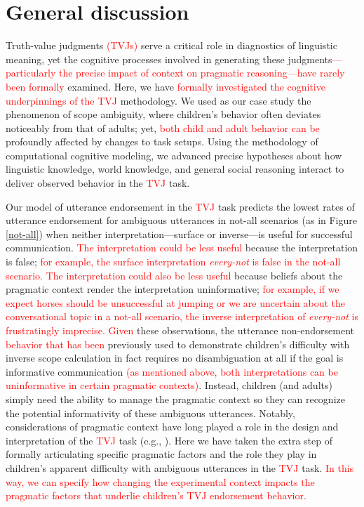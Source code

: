 \documentclass[preprint,authoryear]{elsarticle}\frenchspacing
\newcommand{\lp}[1]{\textcolor{red}{#1}} %
\begin{document}
\section{General discussion} \label{discussion}
Truth-value judgments 
\lp{(TVJs)}
serve a critical role in diagnostics of linguistic meaning, yet the cognitive processes involved in generating these judgments\lp{---particularly the precise impact of context on pragmatic reasoning---}\lp{have rarely been formally} examined. Here, we have 
\lp{formally investigated the cognitive underpinnings of the}
\lp{TVJ}
methodology. We used as our case study the phenomenon of scope ambiguity, where children's behavior often deviates noticeably from that of adults; yet, \lp{both child and adult behavior can be} profoundly affected by changes to task setups.  Using the methodology of computational cognitive modeling, we advanced precise hypotheses about how linguistic knowledge, world knowledge, and general social reasoning interact to deliver observed behavior in the 
\lp{TVJ}
task.

Our model of utterance endorsement in the %
\lp{TVJ}
task predicts the lowest rates of utterance endorsement for ambiguous utterances in not-all  scenarios (as in Figure \ref{not-all})
when neither interpretation---surface or inverse---is useful for successful communication.
\lp{The interpretation could be less useful}
 because the interpretation is false;  
\lp{for example, the surface interpretation \emph{every-not} is false in the not-all scenario.}
\lp{The interpretation could also be less useful} 
because beliefs about the pragmatic context render the interpretation uninformative;
\lp{for example, if we 
expect horses should be unsuccessful at jumping 
or 
we are uncertain about the conversational topic in a not-all scenario,
the inverse interpretation of \emph{every-not} %
is frustratingly imprecise.
} 
\lp{Given} these observations, 
 the utterance non-endorsement \lp{behavior} \lp{that has been} previously used to demonstrate children's difficulty with {inverse} scope calculation in fact requires no disambiguation at all if the goal is informative communication \lp{(as mentioned above, both interpretations can be uninformative in certain pragmatic contexts)}. Instead, children (and adults) simply need the ability to manage the pragmatic context so they can recognize the potential informativity of these ambiguous utterances. Notably, considerations of pragmatic context have long played a role in the design and interpretation of the 
 \lp{TVJ}
 task (e.g., \citealp{crainetal1996}). Here we have taken the extra step of formally articulating specific pragmatic factors and the role they play in children's apparent difficulty with ambiguous utterances in the
 \lp{TVJ}
 task.
 \lp{In this way, we can specify how changing the experimental context impacts the pragmatic factors that underlie children's TVJ endorsement behavior.}
\end{document}

